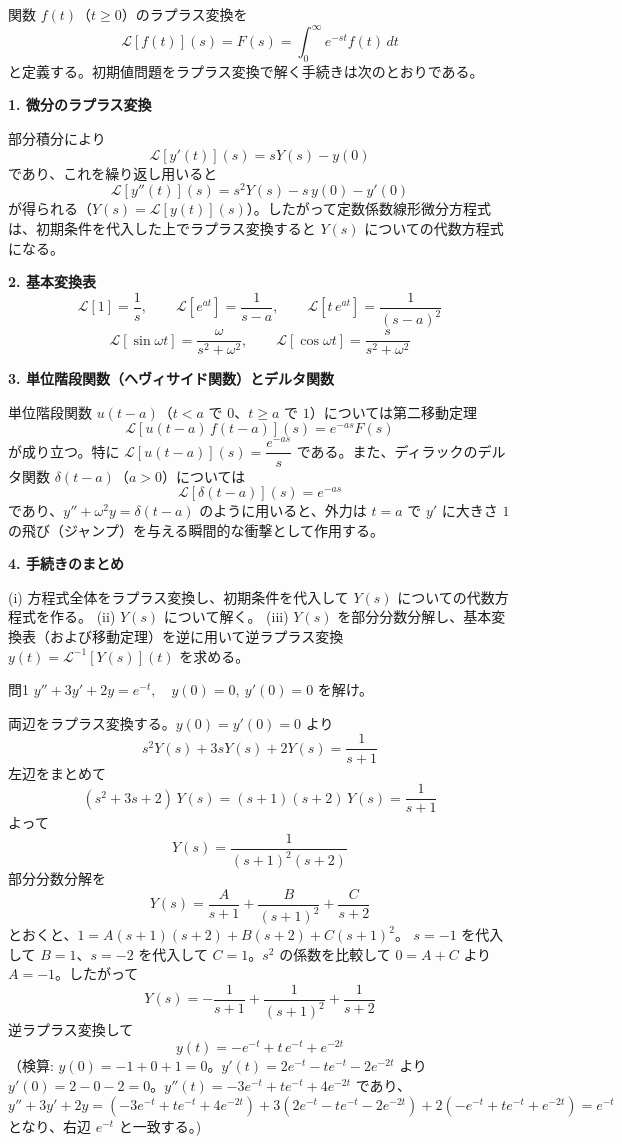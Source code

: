 \documentclass[a4paper,11pt]{article}
\begin{document}


\noindent
関数 $f(t)$（$t \ge 0$）のラプラス変換を
\[
\mathcal{L}[f(t)](s) = F(s) = \int_{0}^{\infty} e^{-st} f(t)\,dt
\]
と定義する。初期値問題をラプラス変換で解く手続きは次のとおりである。

\medskip
\noindent
\textbf{1. 微分のラプラス変換}

部分積分により
\[
\mathcal{L}[y'(t)](s) = sY(s) - y(0)
\]
であり、これを繰り返し用いると
\[
\mathcal{L}[y''(t)](s) = s^{2}Y(s) - s\,y(0) - y'(0)
\]
が得られる（$Y(s) = \mathcal{L}[y(t)](s)$）。したがって定数係数線形微分方程式は、初期条件を代入した上でラプラス変換すると $Y(s)$ についての代数方程式になる。

\medskip
\noindent
\textbf{2. 基本変換表}
\[
\mathcal{L}[1] = \frac{1}{s}, \qquad
\mathcal{L}[e^{at}] = \frac{1}{s-a}, \qquad
\mathcal{L}[t\,e^{at}] = \frac{1}{(s-a)^{2}}
\]
\[
\mathcal{L}[\sin \omega t] = \frac{\omega}{s^{2}+\omega^{2}}, \qquad
\mathcal{L}[\cos \omega t] = \frac{s}{s^{2}+\omega^{2}}
\]

\medskip
\noindent
\textbf{3. 単位階段関数（ヘヴィサイド関数）とデルタ関数}

単位階段関数 $u(t-a)$（$t<a$ で $0$、$t \ge a$ で $1$）については第二移動定理
\[
\mathcal{L}[u(t-a)\,f(t-a)](s) = e^{-as} F(s)
\]
が成り立つ。特に $\mathcal{L}[u(t-a)](s) = \dfrac{e^{-as}}{s}$ である。また、ディラックのデルタ関数 $\delta(t-a)$（$a>0$）については
\[
\mathcal{L}[\delta(t-a)](s) = e^{-as}
\]
であり、$y'' + \omega^{2} y = \delta(t-a)$ のように用いると、外力は $t=a$ で $y'$ に大きさ $1$ の飛び（ジャンプ）を与える瞬間的な衝撃として作用する。

\medskip
\noindent
\textbf{4. 手続きのまとめ}

(i) 方程式全体をラプラス変換し、初期条件を代入して $Y(s)$ についての代数方程式を作る。
(ii) $Y(s)$ について解く。
(iii) $Y(s)$ を部分分数分解し、基本変換表（および移動定理）を逆に用いて逆ラプラス変換 $y(t) = \mathcal{L}^{-1}[Y(s)](t)$ を求める。

\clearpage
\begin{mondaiboxS}{問1}
$y'' + 3y' + 2y = e^{-t}, \quad y(0) = 0,\ y'(0) = 0$ を解け。
\end{mondaiboxS}
\kaitou
両辺をラプラス変換する。$y(0)=y'(0)=0$ より
\[
s^{2}Y(s) + 3sY(s) + 2Y(s) = \frac{1}{s+1}
\]
左辺をまとめて
\[
(s^{2}+3s+2)\,Y(s) = (s+1)(s+2)\,Y(s) = \frac{1}{s+1}
\]
よって
\[
Y(s) = \frac{1}{(s+1)^{2}(s+2)}
\]
部分分数分解を
\[
Y(s) = \frac{A}{s+1} + \frac{B}{(s+1)^{2}} + \frac{C}{s+2}
\]
とおくと、$1 = A(s+1)(s+2) + B(s+2) + C(s+1)^{2}$。
$s=-1$ を代入して $B=1$、$s=-2$ を代入して $C=1$。$s^{2}$ の係数を比較して $0 = A+C$ より $A=-1$。したがって
\[
Y(s) = -\frac{1}{s+1} + \frac{1}{(s+1)^{2}} + \frac{1}{s+2}
\]
逆ラプラス変換して
\[
\boxed{\; y(t) = -e^{-t} + t\,e^{-t} + e^{-2t} \;}
\]
（検算: $y(0) = -1+0+1=0$。$y'(t) = 2e^{-t} - t e^{-t} - 2e^{-2t}$ より $y'(0) = 2-0-2=0$。$y''(t) = -3e^{-t}+t e^{-t}+4e^{-2t}$ であり、
$y''+3y'+2y = (-3e^{-t}+te^{-t}+4e^{-2t}) + 3(2e^{-t}-te^{-t}-2e^{-2t}) + 2(-e^{-t}+te^{-t}+e^{-2t}) = e^{-t}$
となり、右辺 $e^{-t}$ と一致する。)
\end{document}
